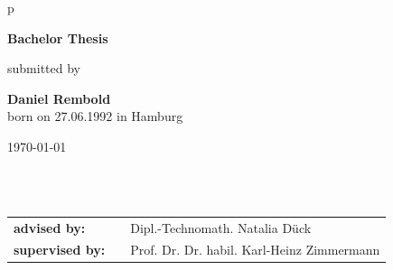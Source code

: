 \begin{center}
\begin{tabular}{p{\textwidth}}
\\

\begin{center}
\textbf{\Large{Bachelor Thesis}}
\end{center}




\begin{center}
submitted by
\end{center}

\begin{center}
\large{\textbf{Daniel Rembold}} \\
\small{born on 27.06.1992 in Hamburg}
\end{center}

\begin{center}
\large{\today}
\end{center}

\\

\\

\begin{center}
\begin{tabular}{lll}
\textbf{advised by:} & & Dipl.-Technomath. Natalia D\"uck \\
\textbf{supervised by:} & & Prof. Dr. Dr. habil. Karl-Heinz Zimmermann\\
\end{tabular}
\end{center}

\end{tabular}
\end{center}